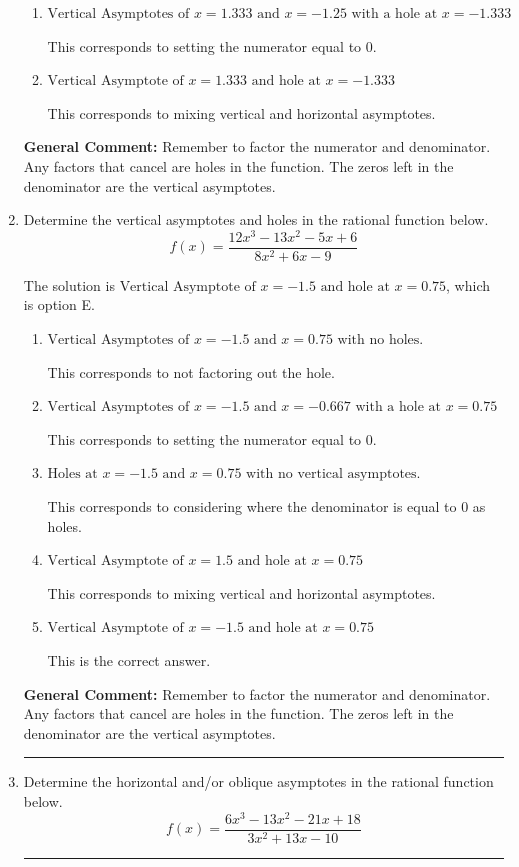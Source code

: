 \documentclass{extbook}[14pt]
\newcommand{\litem}[1]{\item #1

\rule{\textwidth}{0.4pt}}
\begin{document}
\begin{enumerate}
{\begin{enumerate}[label=\Alph*.]
This is the correct answer.
\item \( \text{Vertical Asymptotes of } x = 1.333 \text{ and } x = -1.25 \text{ with a hole at } x = -1.333 \)

This corresponds to setting the numerator equal to 0.
\item \( \text{Vertical Asymptote of } x = 1.333 \text{ and hole at } x = -1.333 \)

This corresponds to mixing vertical and horizontal asymptotes.
\end{enumerate}

\textbf{General Comment:} Remember to factor the numerator and denominator. Any factors that cancel are holes in the function. The zeros left in the denominator are the vertical asymptotes.
}
\litem{
Determine the vertical asymptotes and holes in the rational function below.
\[ f(x) = \frac{12x^{3} -13 x^{2} -5 x + 6}{8x^{2} +6 x -9} \]

The solution is \( \text{Vertical Asymptote of } x = -1.5 \text{ and hole at } x = 0.75 \), which is option E.\begin{enumerate}[label=\Alph*.]
\item \( \text{Vertical Asymptotes of } x = -1.5 \text{ and } x = 0.75 \text{ with no holes.} \)

This corresponds to not factoring out the hole.
\item \( \text{Vertical Asymptotes of } x = -1.5 \text{ and } x = -0.667 \text{ with a hole at } x = 0.75 \)

This corresponds to setting the numerator equal to 0.
\item \( \text{Holes at } x = -1.5 \text{ and } x = 0.75 \text{ with no vertical asymptotes.} \)

This corresponds to considering where the denominator is equal to 0 as holes.
\item \( \text{Vertical Asymptote of } x = 1.5 \text{ and hole at } x = 0.75 \)

This corresponds to mixing vertical and horizontal asymptotes.
\item \( \text{Vertical Asymptote of } x = -1.5 \text{ and hole at } x = 0.75 \)

This is the correct answer.
\end{enumerate}

\textbf{General Comment:} Remember to factor the numerator and denominator. Any factors that cancel are holes in the function. The zeros left in the denominator are the vertical asymptotes.
}
\litem{
Determine the horizontal and/or oblique asymptotes in the rational function below.
\[ f(x) = \frac{6x^{3} -13 x^{2} -21 x + 18}{3x^{2} +13 x -10} \]

}
\end{enumerate}
\end{document}
